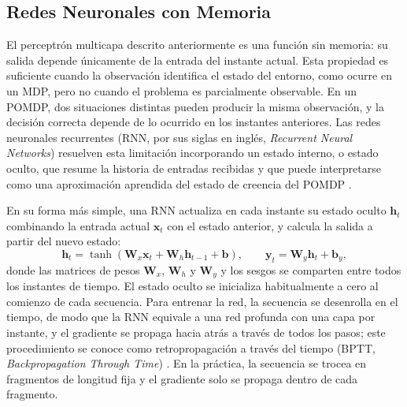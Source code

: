 %     

\subsection{Redes Neuronales con Memoria}\label{sec:fund-redes-memoria}
El perceptrón multicapa descrito anteriormente es una función sin memoria: su salida depende únicamente de la entrada del instante actual. Esta propiedad es suficiente cuando la observación identifica el estado del entorno, como ocurre en un MDP, pero no cuando el problema es parcialmente observable. En un POMDP, dos situaciones distintas pueden producir la misma observación, y la decisión correcta depende de lo ocurrido en los instantes anteriores. Las redes neuronales recurrentes (RNN, por sus siglas en inglés, \textit{Recurrent Neural Networks}) resuelven esta limitación incorporando un estado interno, o estado oculto, que resume la historia de entradas recibidas y que puede interpretarse como una aproximación aprendida del estado de creencia del POMDP \citep{mienye2024recurrent}.

En su forma más simple, una RNN actualiza en cada instante su estado oculto $\mathbf{h}_t$ combinando la entrada actual $\mathbf{x}_t$ con el estado anterior, y calcula la salida a partir del nuevo estado:
\begin{equation}
    \mathbf{h}_t = \tanh\left( \mathbf{W}_x \mathbf{x}_t + \mathbf{W}_h \mathbf{h}_{t-1} + \mathbf{b} \right), \qquad \mathbf{y}_t = \mathbf{W}_y \mathbf{h}_t + \mathbf{b}_y,
\end{equation}
donde las matrices de pesos $\mathbf{W}_x$, $\mathbf{W}_h$ y $\mathbf{W}_y$ y los sesgos se comparten entre todos los instantes de tiempo. El estado oculto se inicializa habitualmente a cero al comienzo de cada secuencia. Para entrenar la red, la secuencia se desenrolla en el tiempo, de modo que la RNN equivale a una red profunda con una capa por instante, y el gradiente se propaga hacia atrás a través de todos los pasos; este procedimiento se conoce como retropropagación a través del tiempo (BPTT, \textit{Backpropagation Through Time}) \citep{werbos1990backpropagation}. En la práctica, la secuencia se trocea en fragmentos de longitud fija y el gradiente solo se propaga dentro de cada fragmento.

